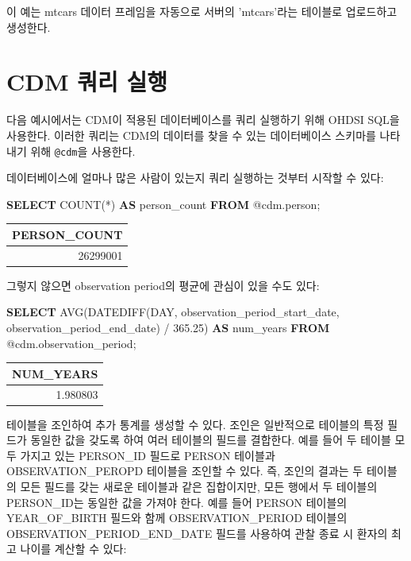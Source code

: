\documentclass[10.5pt]{book}
\newenvironment{Shaded}{\begin{snugshade}}{\end{snugshade}}
\newcommand{\KeywordTok}[1]{\textcolor[rgb]{0.13,0.29,0.53}{\textbf{#1}}}
\newcommand{\DataTypeTok}[1]{\textcolor[rgb]{0.13,0.29,0.53}{#1}}
\newcommand{\FloatTok}[1]{\textcolor[rgb]{0.00,0.00,0.81}{#1}}
\newcommand{\FunctionTok}[1]{\textcolor[rgb]{0.00,0.00,0.00}{#1}}
\newcommand{\NormalTok}[1]{#1}
\theoremstyle{definition}
\theoremstyle{definition}
\theoremstyle{definition}
\theoremstyle{remark}
\begin{document}
이 예는 mtcars 데이터 프레임을 자동으로 서버의 'mtcars'라는 테이블로
업로드하고 생성한다.

\section{CDM 쿼리 실행}\label{QueryTheCdm}

다음 예시에서는 CDM이 적용된 데이터베이스를 쿼리 실행하기 위해 OHDSI
SQL을 사용한다. 이러한 쿼리는 CDM의 데이터를 찾을 수 있는 데이터베이스
스키마를 나타내기 위해 \texttt{@cdm}을 사용한다.

데이터베이스에 얼마나 많은 사람이 있는지 쿼리 실행하는 것부터 시작할 수
있다:

\begin{Shaded}
\begin{Highlighting}[]
\KeywordTok{SELECT} \FunctionTok{COUNT}\NormalTok{(*) }\KeywordTok{AS}\NormalTok{ person_count }\KeywordTok{FROM}\NormalTok{ @cdm.person;}
\end{Highlighting}
\end{Shaded}

\begin{longtable}[]{@{}r@{}}
\toprule
PERSON\_COUNT\tabularnewline
\midrule
\endhead
26299001\tabularnewline
\bottomrule
\end{longtable}

그렇지 않으면 observation period의 평균에 관심이 있을 수도 있다:

\begin{Shaded}
\begin{Highlighting}[]
\KeywordTok{SELECT} \FunctionTok{AVG}\NormalTok{(DATEDIFF(}\DataTypeTok{DAY}\NormalTok{,}
\NormalTok{                    observation_period_start_date,}
\NormalTok{                    observation_period_end_date) / }\FloatTok{365.25}\NormalTok{) }\KeywordTok{AS}\NormalTok{ num_years}
\KeywordTok{FROM}\NormalTok{ @cdm.observation_period;}
\end{Highlighting}
\end{Shaded}

\begin{longtable}[]{@{}r@{}}
\toprule
NUM\_YEARS\tabularnewline
\midrule
\endhead
1.980803\tabularnewline
\bottomrule
\end{longtable}

테이블을 조인하여 추가 통계를 생성할 수 있다. 조인은 일반적으로 테이블의
특정 필드가 동일한 값을 갖도록 하여 여러 테이블의 필드를 결합한다. 예를
들어 두 테이블 모두 가지고 있는 PERSON\_ID 필드로 PERSON 테이블과
OBSERVATION\_PEROPD 테이블을 조인할 수 있다. 즉, 조인의 결과는 두
테이블의 모든 필드를 갖는 새로운 테이블과 같은 집합이지만, 모든 행에서
두 테이블의 PERSON\_ID는 동일한 값을 가져야 한다. 예를 들어 PERSON
테이블의 YEAR\_OF\_BIRTH 필드와 함께 OBSERVATION\_PERIOD 테이블의
OBSERVATION\_PERIOD\_END\_DATE 필드를 사용하여 관찰 종료 시 환자의 최고
나이를 계산할 수 있다:
\end{document}
